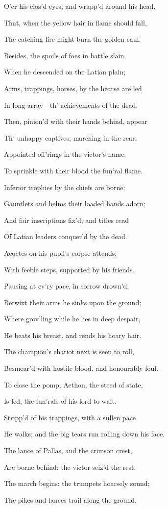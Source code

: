 O’er his clos’d eyes, and wrapp’d around his head,

That, when the yellow hair in flame should fall,

The catching fire might burn the golden caul.

Besides, the spoils of foes in battle slain,

When he descended on the Latian plain;

Arms, trappings, horses, by the hearse are led

In long array—th’ achievements of the dead.

Then, pinion’d with their hands behind, appear

Th’ unhappy captives, marching in the rear,

Appointed off’rings in the victor’s name,

To sprinkle with their blood the fun’ral flame.

Inferior trophies by the chiefs are borne;

Gauntlets and helms their loaded hands adorn;

And fair inscriptions fix’d, and titles read

Of Latian leaders conquer’d by the dead.

Acoetes on his pupil’s corpse attends,

With feeble steps, supported by his friends.

Pausing at ev’ry pace, in sorrow drown’d,

Betwixt their arms he sinks upon the ground;

Where grov’ling while he lies in deep despair,

He beats his breast, and rends his hoary hair.

The champion’s chariot next is seen to roll,

Besmear’d with hostile blood, and honourably foul.

To close the pomp, Aethon, the steed of state,

Is led, the fun’rals of his lord to wait.

Stripp’d of his trappings, with a sullen pace

He walks; and the big tears run rolling down his face.

The lance of Pallas, and the crimson crest,

Are borne behind: the victor seiz’d the rest.

The march begins: the trumpets hoarsely sound;

The pikes and lances trail along the ground.

